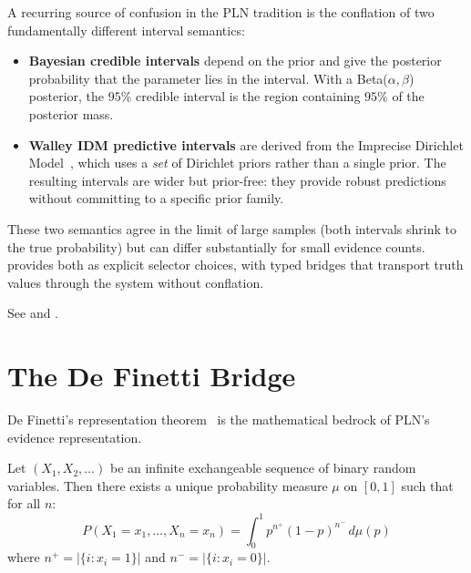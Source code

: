 \documentclass[11pt,openany]{report}
\begin{document}
A recurring source of confusion in the PLN tradition is the conflation
of two fundamentally different interval semantics:

\begin{itemize}
\item \textbf{Bayesian credible intervals} depend on the prior and give
  the posterior probability that the parameter lies in the interval.
  With a Beta($\alpha, \beta$) posterior, the $95\%$ credible interval
  is the region containing $95\%$ of the posterior mass.

\item \textbf{Walley IDM predictive intervals} are derived from the
  Imprecise Dirichlet Model~\cite{Walley1996BagOfMarbles}, which uses
  a \emph{set} of Dirichlet priors rather than a single prior.  The
  resulting intervals are wider but prior-free: they provide robust
  predictions without committing to a specific prior family.
\end{itemize}

These two semantics agree in the limit of large samples (both intervals
shrink to the true probability) but can differ substantially for small
evidence counts.  \xiPLN{} provides both as explicit selector choices,
with typed bridges that transport truth values through the system
without conflation.

See  and
.

\section{The De Finetti Bridge}

De Finetti's representation theorem~\cite{definetti1937} is the
mathematical bedrock of PLN's evidence representation.

\begin{theorem}
Let $(X_1, X_2, \ldots)$ be an infinite exchangeable sequence of
binary random variables.  Then there exists a unique probability
measure $\mu$ on $[0,1]$ such that for all $n$:
\[
  P(X_1 = x_1, \ldots, X_n = x_n) =
  \int_0^1 p^{n^+}(1-p)^{n^-}\, d\mu(p)
\]
where $n^+ = |\{i : x_i = 1\}|$ and $n^- = |\{i : x_i = 0\}|$.
\end{theorem}
\end{document}
